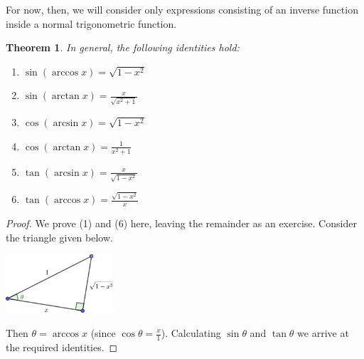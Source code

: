 \documentclass[a4paper,leqno]{article}
\numberwithin{equation}{section}
\newtheorem{thm}[equation]{Theorem}
\theoremstyle{definition}
\theoremstyle{remark}
\begin{document}
For now, then, we will consider only expressions consisting of an inverse function inside a normal trigonometric function.
\begin{thm}
  In general, the following identities hold:
  \begin{enumerate}
    \item $ \sin(\arccos x) = \sqrt{1 - x^2} $
    \item $ \sin(\arctan x) = \frac{x}{\sqrt{x^2 + 1}} $
    \item $ \cos(\arcsin x) = \sqrt{1 - x^2} $
    \item $ \cos(\arctan x) = \frac{1}{x^2 + 1} $
    \item $ \tan(\arcsin x) = \frac{x}{\sqrt{1 - x^2}} $
    \item $ \tan(\arccos x) = \frac{\sqrt{1 - x^2}}{x} $
  \end{enumerate}
\end{thm}
\begin{proof}
  We prove (1) and (6) here, leaving the remainder as an exercise. Consider the triangle given below.
  \begin{center}
    \includegraphics[width=0.3\textwidth]{invid1}
  \end{center}
  Then $ \theta = \arccos x $ (since $ \cos \theta = \frac{x}{1} $). Calculating $ \sin \theta $ and $ \tan \theta $
  we arrive at the required identities.
\end{proof}
\end{document}
